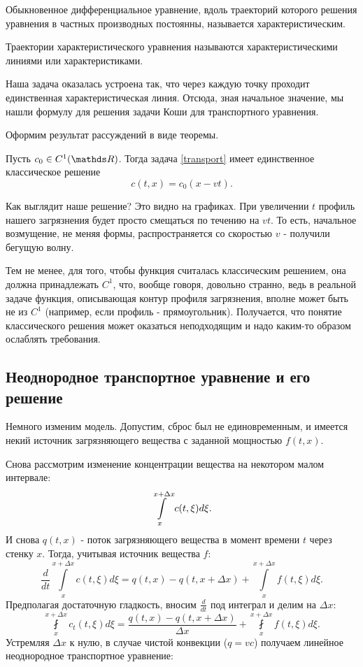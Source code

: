 \begin{definition} Обыкновенное дифференциальное уравнение, вдоль траекторий которого решения уравнения в частных производных постоянны, называется характеристическим.
\end{definition}

\begin{definition} Траектории характеристического уравнения называются характеристическими линиями или характеристиками.
\end{definition}

Наша задача оказалась устроена так, что через каждую точку проходит единственная характеристическая линия. Отсюда, зная начальное значение, мы нашли формулу для решения задачи Коши для транспортного уравнения.

Оформим результат рассуждений в виде теоремы.

\begin{theorem}
Пусть $c_0 \in C^1(\real)$. Тогда задача \eqref{transport} имеет единственное классическое решение $$ c (t,x) = c_0 (x - v t) .$$
\end{theorem}



Как выглядит наше решение? Это видно на графиках. При увеличении $t$ профиль нашего загрязнения будет просто смещаться по течению на $vt$. То есть, начальное возмущение, не меняя формы, распространяется со скоростью $v$ - получили бегущую волну.

Тем не менее, для того, чтобы функция считалась классическим решением, она должна принадлежать $C^1$, что, вообще говоря, довольно странно, ведь в реальной задаче функция, описывающая контур профиля загрязнения, вполне может быть не из $C^1$ (например, если профиль - прямоугольник). Получается, что понятие классического решения может оказаться неподходящим и надо каким-то образом ослаблять требования.

\subsection{Неоднородное транспортное уравнение и его решение}

Немного изменим модель. Допустим, сброс был не единовременным, и имеется некий источник загрязняющего вещества с заданной мощностью $f(t,x)$. %

Снова рассмотрим изменение концентрации вещества на некотором малом интервале:
$$ \displaystyle \int \limits_x^{x + \Delta x} c (t, \xi) d \xi .$$
И снова $ q (t, x) $ - поток загрязняющего вещества в момент времени $t$ через стенку $x$. Тогда, учитывая источник вещества $f$:
$$ \frac{d}{dt} \int \limits_x^{x + \Delta x} c(t, \xi ) d \xi = q(t, x) - q(t, x + \Delta x) + \int \limits_x^{x+\Delta x} f(t,\xi) d\xi. $$
Предполагая достаточную гладкость, вносим $ \displaystyle \frac {d} {dt} $ под интеграл и делим на $ \Delta x $:
$$ \fint \limits_x^{x + \Delta x} c_t (t, \xi) d \xi  = \frac {q  (t, x) - q (t, x + \Delta x)}  {\Delta x} + \fint \limits_x^{x+\Delta x} f(t,\xi) d\xi. $$
Устремляя $ \Delta x$ к нулю, в случае чистой конвекции ($ q = vc $) получаем линейное неоднородное транспортное уравнение:

